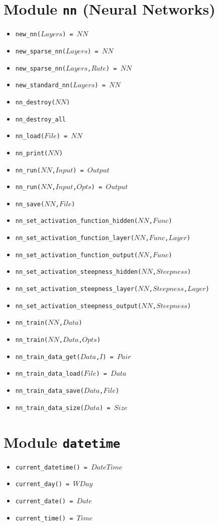 \documentclass[10pt]{article}
\newcommand{\ignore}[1]{}
\begin{document}
\begin{multicols}{2}
\section*{Module \texttt{nn} (Neural Networks)}
\begin{scriptsize}
\begin{itemize}
\item \texttt{new\_nn($Layers$) = $NN$}
\item \texttt{new\_sparse\_nn($Layers$) = $NN$}
\item \texttt{new\_sparse\_nn($Layers$,$Rate$) = $NN$}
\item \texttt{new\_standard\_nn($Layers$) = $NN$}
\item \texttt{nn\_destroy($NN$)}
\item \texttt{nn\_destroy\_all}
\item \texttt{nn\_load($File$) = $NN$}
\item \texttt{nn\_print($NN$)}
\item \texttt{nn\_run($NN$,$Input$) = $Output$}
\item \texttt{nn\_run($NN$,$Input$,$Opts$) = $Output$}
\item \texttt{nn\_save($NN$,$File$)}
\item \texttt{nn\_set\_activation\_function\_hidden($NN$,$Func$)}
\item \texttt{nn\_set\_activation\_function\_layer($NN$,$Func$,$Layer$)}
\item \texttt{nn\_set\_activation\_function\_output($NN$,$Func$)}
\item \texttt{nn\_set\_activation\_steepness\_hidden($NN$,$Steepness$)}
\item \texttt{nn\_set\_activation\_steepness\_layer($NN$,$Steepness$,$Layer$)}
\item \texttt{nn\_set\_activation\_steepness\_output($NN$,$Steepness$)}
\item \texttt{nn\_train($NN$,$Data$)}
\item \texttt{nn\_train($NN$,$Data$,$Opts$)}
\item \texttt{nn\_train\_data\_get($Data$,$I$) = $Pair$}
\item \texttt{nn\_train\_data\_load($File$) = $Data$}
\item \texttt{nn\_train\_data\_save($Data$,$File$)}
\item \texttt{nn\_train\_data\_size($Data$) = $Size$}
\end{itemize}
\end{scriptsize}
\section*{Module \texttt{datetime}}
\begin{scriptsize}
\begin{itemize}
\item \texttt{current\_datetime() = $DateTime$}
\item \texttt{current\_day() = $WDay$}
\item \texttt{current\_date() = $Date$}
\item \texttt{current\_time() = $Time$}
\end{itemize}
\end{scriptsize}
\ignore{
}
\end{multicols}
\end{document}
